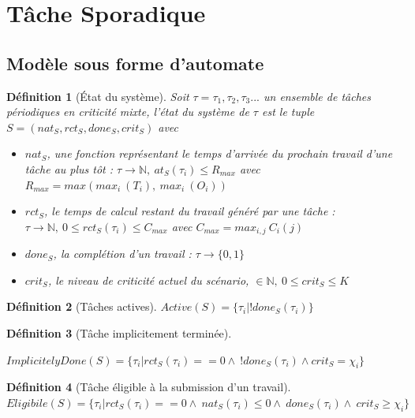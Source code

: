 \documentclass[a4paper]{report}
\theoremstyle{break}
\newtheorem{defin}{Définition}
\theoremstyle{breakplain}
\begin{document}
\section{Tâche Sporadique}
\subsection{Modèle sous forme d'automate}


\begin{defin}[État du système]
\label{systemstate}
Soit $\tau = \tau_1, \tau_2, \tau_3 ...$ un ensemble de tâches périodiques en criticité mixte, l'état du système de $\tau$ est le tuple $S = (nat_S, rct_S, done_S, crit_S)$ avec

\begin{itemize}
\item $nat_S$, une fonction représentant le temps d'arrivée du prochain travail d'une tâche au plus tôt : $\tau \rightarrow \mathbb{N},\ at_S(\tau_i) \leq R_{max}$ avec $R_{max} = max(max_i\ (T_i),\ max_i\ (O_i))$
\item $rct_S$, le temps de calcul restant du travail généré par une tâche : $ \tau \rightarrow \mathbb{N},\ 0 \leq rct_S(\tau_i) \leq C_{max}$ avec $C_{max} = max_{i,j}\ C_i(j)$
\item $done_S$, la complétion d'un travail : $ \tau \rightarrow \{0,1\}$
\item $crit_S$, le niveau de criticité actuel du scénario, $ \in \mathbb{N},\ 0 \leq crit_S \leq K$

\end{itemize}

\end{defin}

\begin{defin}[Tâches actives]
\label{active}
$Active(S) = \{\tau_i | !done_S(\tau_i)\}$
\end{defin}


\begin{defin}[Tâche implicitement terminée]
\label{impdone}

$ImplicitelyDone(S) = \{\tau_i | rct_S(\tau_i) == 0 \wedge\ !done_S(\tau_i)\wedge crit_S=\chi_i\}$\\
\end{defin}


\begin{defin}[Tâche éligible à la submission d'un travail]
\label{eligible}
$Eligibile(S) = \{\tau_i | rct_S(\tau_i) == 0 \wedge\ nat_S(\tau_i) \leq 0 \wedge\ done_S(\tau_i)\wedge\ crit_S\geq\chi_i\}$\\
\end{defin}
\end{document}
